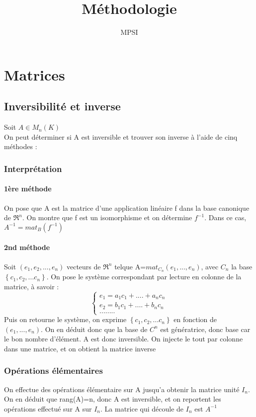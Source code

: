 \documentclass[a4paper,12 pt,oneside]{report}     %
\title{Méthodologie}
\author{MPSI}
\begin{document}
\maketitle
\tableofcontents
\chapter{Matrices}
\section{Inversibilité et inverse}
Soit $A \in M_n(K)$ \\
On peut déterminer si A est inversible et trouver son inverse à l'aide de cinq méthodes :
\subsection{Interprétation}
\subsubsection{1ère méthode}
On pose que A est la matrice d'une application linéaire f dans la base canonique de $\Re^n$. On montre que f est un isomorphisme et on détermine $f^{-1}$. Dans ce cas, $A^{-1}=mat_B(f^{-1})$
\subsubsection{2nd méthode}
Soit $(e_1,e_2,...,e_n)$ vecteurs de $\Re^n$ telque A=$mat_{C_n}(e_1,...,e_n)$, avec $C_n$ la base $\left\{c_1,c_2,...c_n\right\}$. On pose le système correspondant par lecture en colonne de la matrice, à savoir :
  \[\left\{\begin{array}{c}
   e_1 = a_1c_1+....+a_nc_n\\
   e_2 = b_1c_1+....+b_nc_n\\
   ........
  \end{array}\right.
\]
Puis on retourne le système, on exprime $\left\{c_1,c_2,...c_n\right\}$ en fonction de $(e_1,...,e_n)$. On en déduit donc que la base de $C^n$ est génératrice, donc base car le bon nombre d'élément. A est donc inversible. On injecte le tout par colonne dans une matrice, et on obtient la matrice inverse
\subsection{Opérations élémentaires}
On effectue des opérations élémentaire sur A jusqu'a obtenir la matrice unité $I_n$. On en déduit que rang(A)=n, donc A est inversible, et on reportent les opérations effectué sur A sur $I_n$. La matrice qui découle de $I_n$ est $A^{-1}$
\end{document}
